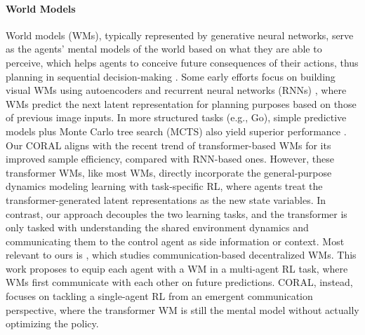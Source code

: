 \documentclass[letterpaper]{article}
\begin{document}
\paragraph{World Models}
World models (WMs), typically represented by generative neural networks, serve as the agents' mental models of the world based on what they are able to perceive, which helps agents to conceive future consequences of their actions, thus planning in sequential decision-making \cite{schmidhuber18wm}. Some early efforts focus on building visual WMs using autoencoders and recurrent neural networks (RNNs) \cite{schmidhuber18wm,hafner19a, hafnerdream, hafner25worldmodel}, where WMs predict the next latent representation for planning purposes based on those of previous image inputs. In more structured tasks (e.g., Go),  simple predictive models plus Monte Carlo tree search (MCTS) also yield superior performance \cite{silver20wm, silver21on-off-wm, tao24col, kim-tao25col}.
Our CORAL aligns with the recent trend of transformer-based WMs \cite{micheli2023transformers, robine2023transformerbased} for its improved sample efficiency, compared with RNN-based ones. However, these transformer WMs, like most WMs, directly incorporate the general-purpose dynamics modeling learning with task-specific RL, where agents treat the transformer-generated latent representations as the new state variables.  In contrast, our approach decouples the two learning tasks, and the transformer is only tasked with understanding the shared environment dynamics and communicating them to the control agent as side information or context. Most relevant to ours is \cite{toledocodreamer}, which studies communication-based decentralized WMs. This work proposes to equip each agent with a WM in a multi-agent RL task, where WMs first communicate with each other on future predictions. CORAL, instead, focuses on tackling a single-agent RL from an emergent communication perspective, where the transformer WM is still the mental model without actually optimizing the policy.
\end{document}
